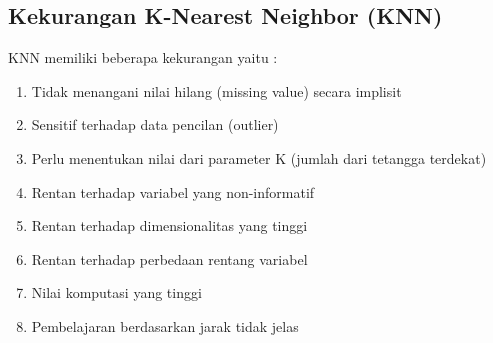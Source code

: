 \subsection{Kekurangan K-Nearest Neighbor (KNN)}
KNN memiliki beberapa kekurangan yaitu :
\begin{enumerate}
    \item Tidak menangani nilai hilang (missing value) secara implisit
    \item Sensitif terhadap data pencilan (outlier)
    \item Perlu menentukan nilai dari parameter K (jumlah dari tetangga terdekat)
    \item Rentan terhadap variabel yang non-informatif
    \item Rentan terhadap dimensionalitas yang tinggi
    \item Rentan terhadap perbedaan rentang variabel
    \item Nilai komputasi yang tinggi
    \item Pembelajaran berdasarkan jarak tidak jelas
\end{enumerate}

